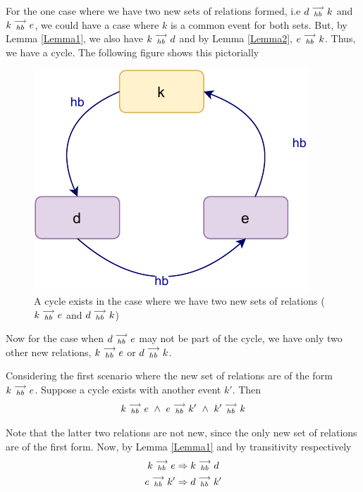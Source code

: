     For the one case where we have two new sets of relations formed, i.e $d\stackrel{\longrightarrow}{_{hb}}k$ and $k\stackrel{\longrightarrow}{_{hb}}e$, we could have a case where $k$ is a common event for both sets. But, by Lemma \ref{Lemma1}, we also have $k\stackrel{\longrightarrow}{_{hb}}d$ and by Lemma \ref{Lemma2}, $e\stackrel{\longrightarrow}{_{hb}}k$\footnotemark. Thus, we have a cycle. The following figure shows this pictorially

    \begin{figure}[H]
        \centering
        \includegraphics[scale=0.7]{InstructionReordering/ValidReorderingProof/ProofParts/Part3/part3(d).pdf}
        \caption{A cycle exists in the case where we have two new sets of relations ($k\stackrel{\longrightarrow}{_{hb}}e$ and $d\stackrel{\longrightarrow}{_{hb}}k$) }
        \label{fig:my_label}
    \end{figure}



    Now for the case when $d\stackrel{\longrightarrow}{_{hb}}e$ may not be part of the cycle, we have only two other new relations, $k\stackrel{\longrightarrow}{_{hb}}e$ or $d\stackrel{\longrightarrow}{_{hb}}k$.

    Considering the first scenario where the new set of relations are of the form $k\stackrel{\longrightarrow}{_{hb}}e$. Suppose a cycle exists with another event $k'$. Then 
    \[
        k\stackrel{\longrightarrow}{_{hb}}e \ \wedge \
        e\stackrel{\longrightarrow}{_{hb}}k' \ \wedge \
        k'\stackrel{\longrightarrow}{_{hb}}k
    \]

    Note that the latter two relations are not new, since the only new set of relations are of the first form. Now, by Lemma \ref{Lemma1} and by transitivity respectively
    \begin{gather*}
        k\stackrel{\longrightarrow}{_{hb}}e \Rightarrow k\stackrel{\longrightarrow}{_{hb}}d \\
        e\stackrel{\longrightarrow}{_{hb}}k' \Rightarrow d\stackrel{\longrightarrow}{_{hb}}k'    
    \end{gather*}

